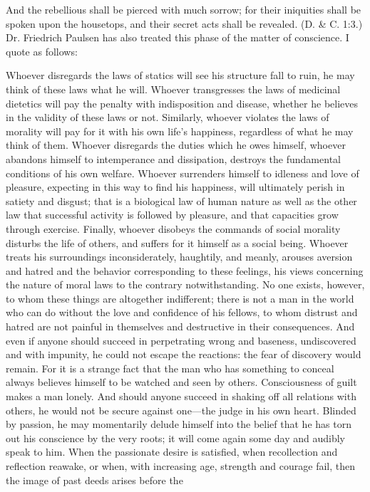 And the rebellious shall be pierced with much sorrow; for their iniquities shall be spoken
upon the housetops, and their secret acts shall be revealed. (D. \& C. 1:3.)
Dr. Friedrich Paulsen has also treated this phase of the matter of conscience. I quote as
follows:

Whoever disregards the laws of statics will see his structure fall to ruin, he may think of these
laws what he will. Whoever transgresses the laws of medicinal dietetics will pay the penalty
with indisposition and disease, whether he believes in the validity of these laws or not.
Similarly, whoever violates the laws of morality will pay for it with his own life's happiness,
regardless of what he may think of them. Whoever disregards the duties which he owes
himself, whoever abandons himself to intemperance and dissipation, destroys the
fundamental conditions of his own welfare. Whoever surrenders himself to idleness and love
of pleasure, expecting in this way to find his happiness, will ultimately perish in satiety and
disgust; that is a biological law of human nature as well as the other law that successful
activity is followed by pleasure, and that capacities grow through exercise. Finally, whoever
disobeys the commands of social morality disturbs the life of others, and suffers for it himself
as a social being. Whoever treats his surroundings inconsiderately, haughtily, and meanly,
arouses aversion and hatred and the behavior corresponding to these feelings, his views
concerning the nature of moral laws to the contrary notwithstanding. No one exists, however,
to whom these things are altogether indifferent; there is not a man in the world who can do
without the love and confidence of his fellows, to whom distrust and hatred are not painful in
themselves and destructive in their consequences. And even if anyone should succeed in
perpetrating wrong and baseness, undiscovered and with impunity, he could not escape the
reactions: the fear of discovery would remain. For it is a strange fact that the man who has
something to conceal always believes himself to be watched and seen by others.
Consciousness of guilt makes a man lonely. And should anyone succeed in shaking off all
relations with others, he would not be secure against one—the judge in his own heart.
Blinded by passion, he may momentarily delude himself into the belief that he has torn out
his conscience by the very roots; it will come again some day and audibly speak to him.
When the passionate desire is satisfied, when recollection and reflection reawake, or when,
with increasing age, strength and courage fail, then the image of past deeds arises before the
